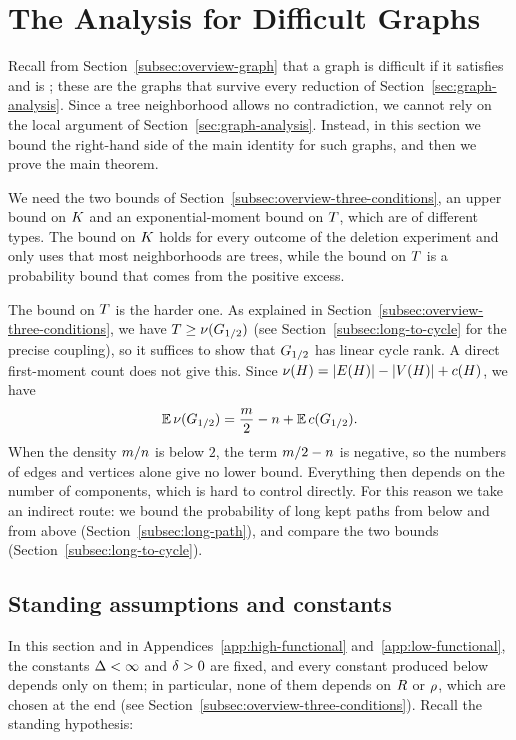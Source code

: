 \section{The Analysis for Difficult Graphs}\label{sec:difficult-graphs}
\label{sec:criterion}

Recall from Section~\ref{subsec:overview-graph} that a graph is difficult if it
satisfies \Hyp{} and is \loctree{\rad}{\nontree}; these are the graphs that
survive every reduction of Section~\ref{sec:graph-analysis}. Since a tree
neighborhood allows no
contradiction, we cannot rely on the local argument of
Section~\ref{sec:graph-analysis}. Instead, in this section we bound the
right-hand side of the main identity for such graphs, and then we prove the
main theorem.

We need the two bounds of Section~\ref{subsec:overview-three-conditions}, an
upper bound on \(K\) and an exponential-moment bound on \(T\), which are
of different types. The bound on \(K\) holds for every outcome of the
deletion experiment and only uses that most neighborhoods are trees, while the
bound on \(T\) is a probability bound that comes from the positive excess.

The bound on \(T\) is the harder one. As explained in
Section~\ref{subsec:overview-three-conditions}, we have
\(T\ge\nu(G_{1/2})\) (see Section~\ref{subsec:long-to-cycle}
for the precise coupling), so it suffices to show that
\(G_{1/2}\) has linear cycle rank. A direct first-moment count does not
give this. Since \(\nu(H)=|E(H)|-|V(H)|+c(H)\), we have
\[
  \mathbb{E}\,\nu(G_{1/2})
  =\frac{m}{2}-n+\mathbb{E}\,c(G_{1/2}) .
\]
When the density \(m/n\) is below \(2\), the term
\(m/2-n\) is negative, so the numbers of edges and vertices alone give
no lower bound. Everything then depends on the number of components, which is
hard to control directly. For this reason we take an indirect route: we bound
the probability of long kept paths from below and from above
(Section~\ref{subsec:long-path}), and compare the two bounds
(Section~\ref{subsec:long-to-cycle}).

\subsection{Standing assumptions and constants}\label{subsec:standing}

In this section and in Appendices~\ref{app:high-functional}
and~\ref{app:low-functional}, the constants \(\Delta<\infty\) and \(\delta>0\) are
fixed, and every constant produced below depends only on them; in particular,
none of them depends on \(R\) or \(\rho\), which are chosen at the end
(see Section~\ref{subsec:overview-three-conditions}). Recall the standing
hypothesis:


